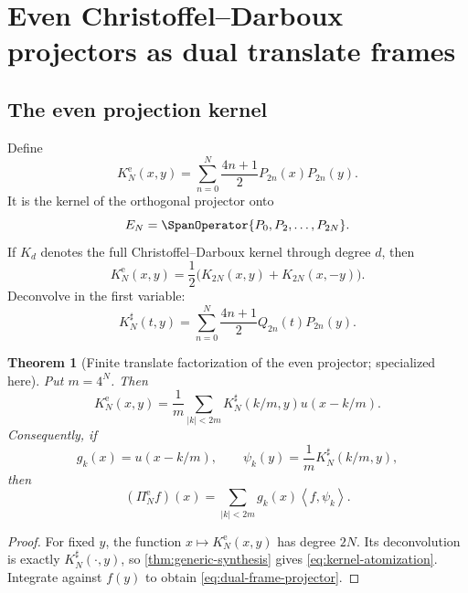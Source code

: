 \documentclass[11pt,oneside]{article}
\numberwithin{equation}{section}
\newtheorem{theorem}{Theorem}[section]
\theoremstyle{definition}
\theoremstyle{remark}
\newcommand{\PiE}{\Pi^{\mathrm e}}
\newcommand{\inner}[2]{\left\langle#1,#2\right\rangle}
\begin{document}
\section{Even Christoffel--Darboux projectors as dual translate frames}
\label{sec:frames}

\subsection{The even projection kernel}

Define
\begin{equation}
 K_N^{\mathrm e}(x,y)
 =\sum_{n=0}^{N}\frac{4n+1}{2}P_{2n}(x)P_{2n}(y).
 \label{eq:even-kernel}
\end{equation}
It is the kernel of the orthogonal projector onto
\begin{equation}
 E_N=\SpanOperator\{P_0,P_2,\ldots,P_{2N}\}.
 \label{eq:EN}
\end{equation}
If $K_d$ denotes the full Christoffel--Darboux kernel through degree $d$, then
\begin{equation}
 K_N^{\mathrm e}(x,y)=\frac12\bigl(K_{2N}(x,y)+K_{2N}(x,-y)\bigr).
 \label{eq:even-CD}
\end{equation}
Deconvolve in the first variable:
\begin{equation}
 K_N^\sharp(t,y)=
 \sum_{n=0}^{N}\frac{4n+1}{2}Q_{2n}(t)P_{2n}(y).
 \label{eq:even-sharp-kernel}
\end{equation}

\begin{theorem}[Finite translate factorization of the even projector; specialized here]
\label{thm:projector-factorization}
Put $m=4^N$.  Then
\begin{equation}
 \boxed{
 K_N^{\mathrm e}(x,y)=\frac1m\sum_{|k|<2m}
 K_N^\sharp(k/m,y)u(x-k/m).}
 \label{eq:kernel-atomization}
\end{equation}
Consequently, if
\begin{equation}
 g_k(x)=u(x-k/m),
 \qquad
 \psi_k(y)=\frac1mK_N^\sharp(k/m,y),
 \label{eq:dual-families}
\end{equation}
then
\begin{equation}
 \boxed{
 (\PiE_Nf)(x)=\sum_{|k|<2m}g_k(x)\inner{f}{\psi_k}.}
 \label{eq:dual-frame-projector}
\end{equation}
\end{theorem}

\begin{proof}
For fixed $y$, the function $x\mapsto K_N^{\mathrm e}(x,y)$ has degree $2N$.
Its deconvolution is exactly $K_N^\sharp(\cdot,y)$, so
\cref{thm:generic-synthesis} gives \eqref{eq:kernel-atomization}.  Integrate
against $f(y)$ to obtain \eqref{eq:dual-frame-projector}.
\end{proof}
\end{document}
